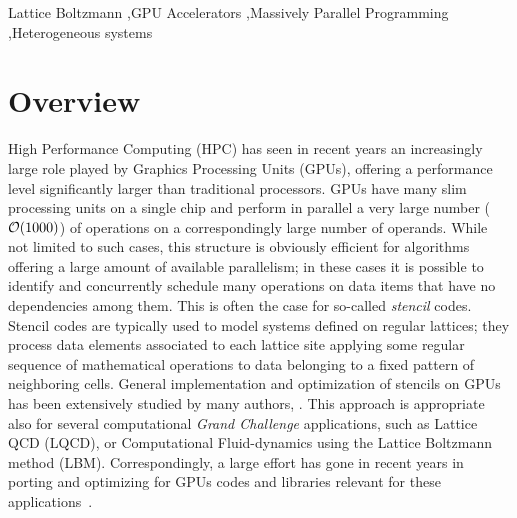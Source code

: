 \documentclass{elsarticle}
\begin{document}
\begin{frontmatter}
\begin{abstract}
\end{abstract}


\begin{keyword}
     Lattice Boltzmann 
\sep GPU Accelerators 
\sep Massively Parallel Programming 
\sep Heterogeneous systems 

\end{keyword}


\end{frontmatter}



\section{Overview}
High Performance Computing (HPC) has seen in recent years an increasingly  large
role played by Graphics Processing Units (GPUs), offering a  performance level
significantly larger than traditional processors.  GPUs have many slim
processing units on a single chip and perform in  parallel a very large number
(${\cal O}(1000)$) of operations on a correspondingly large number of operands. 
%
While not limited to such cases, this structure is obviously efficient for 
algorithms offering a large amount of available parallelism; in these cases 
it is possible to identify and concurrently schedule many operations on data 
items that have no dependencies among them.
%
This is often the case for so-called {\em stencil} codes.  Stencil
codes are typically used to model systems defined on regular lattices;  they
process data elements associated to each lattice site applying some regular
sequence of mathematical operations to data belonging to a fixed pattern  of
neighboring cells. General implementation and optimization of stencils on GPUs 
has been extensively studied by many authors, \cite{stencil1,stencil2,stencil3,stencil4}.
%
This approach is appropriate also for several computational 
{\em Grand Challenge} applications, such as Lattice QCD (LQCD), or  Computational
Fluid-dynamics using the Lattice Boltzmann method (LBM).  Correspondingly, a
large effort has gone in recent years in porting and optimizing for GPUs codes
and libraries relevant for these applications~\cite{cudagpucode,QUDA,toelke10,bernaschi10}. 
\end{document}
